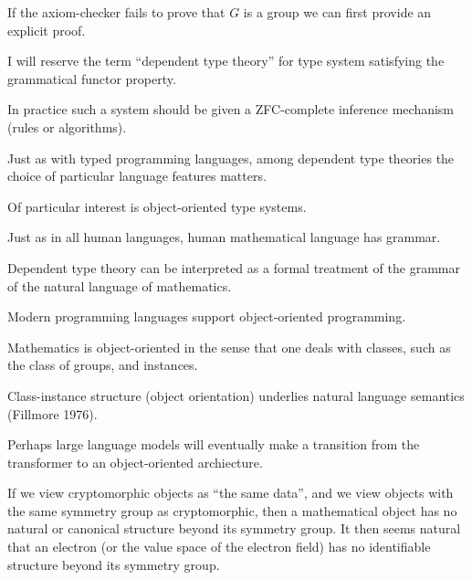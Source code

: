 {\vfill
If the axiom-checker fails to prove that $G$ is a group we can first provide an explicit proof.


\vfill
I will reserve the term ``dependent type theory'' for type system satisfying the grammatical functor property.

\vfill
In practice such a system should be given a ZFC-complete inference mechanism (rules or algorithms).

\vfill
Just as with typed programming languages, among dependent type theories the choice of particular language features matters.

\vfill
Of particular interest is object-oriented type systems.



Just as in all human languages, human mathematical language has grammar.

\vfill
Dependent type theory can be interpreted as a formal treatment of the grammar of the natural language of mathematics.

Modern programming languages support object-oriented programming.

\vfill
Mathematics is object-oriented in the sense that one deals with classes, such as the class of groups, and instances.

\vfill
Class-instance structure (object orientation) underlies natural language semantics (Fillmore 1976).

\vfill
Perhaps large language models will eventually make a transition from the transformer to an object-oriented archiecture.



If we view cryptomorphic objects as ``the same data'', and we view objects with the same symmetry group as cryptomorphic,
then a mathematical object has no natural or canonical structure beyond its symmetry group.
It then seems natural that an electron (or the value space of the electron field) has no identifiable structure
beyond its symmetry group.




\vspace{-.5in}
~ \hfill\unnamed
    {
    }{
      }
\hfill ~


}



